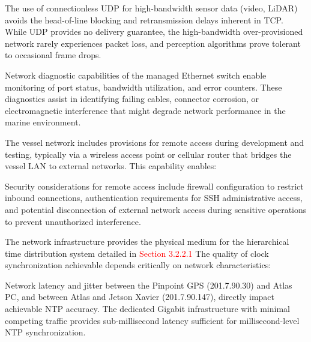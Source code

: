 \documentclass{erauthesis}
\begin{document}
The use of connectionless UDP for high-bandwidth sensor data (video, LiDAR) avoids the head-of-line blocking and retransmission delays inherent in TCP. While UDP provides no delivery guarantee, the high-bandwidth over-provisioned network rarely experiences packet loss, and perception algorithms prove tolerant to occasional frame drops.

Network diagnostic capabilities of the managed Ethernet switch enable monitoring of port status, bandwidth utilization, and error counters. These diagnostics assist in identifying failing cables, connector corrosion, or electromagnetic interference that might degrade network performance in the marine environment.


The vessel network includes provisions for remote access during development and testing, typically via a wireless access point or cellular router that bridges the vessel LAN to external networks. This capability enables:


Security considerations for remote access include firewall configuration to restrict inbound connections, authentication requirements for SSH administrative access, and potential disconnection of external network access during sensitive operations to prevent unauthorized interference.


The network infrastructure provides the physical medium for the hierarchical time distribution system detailed in \textcolor{red}{Section 3.2.2.1}
The quality of clock synchronization achievable depends critically on network characteristics:

Network latency and jitter between the Pinpoint GPS (201.7.90.30) and Atlas PC, and between Atlas and Jetson Xavier (201.7.90.147), directly impact achievable NTP accuracy. The dedicated Gigabit infrastructure with minimal competing traffic provides sub-millisecond latency sufficient for millisecond-level NTP synchronization.
\end{document}
